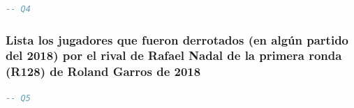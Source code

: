 \documentclass[10pt]{opticajnl}
\begin{document}
\begin{lstlisting}[language=SQL]
-- Q4
\end{lstlisting}





\subsubsection{Lista los jugadores que fueron derrotados (en algún partido del 2018) por el rival de Rafael Nadal de la primera ronda (R128) de Roland Garros de 2018}

\begin{lstlisting}[language=SQL]
-- Q5
\end{lstlisting}
    
    
\end{document}
